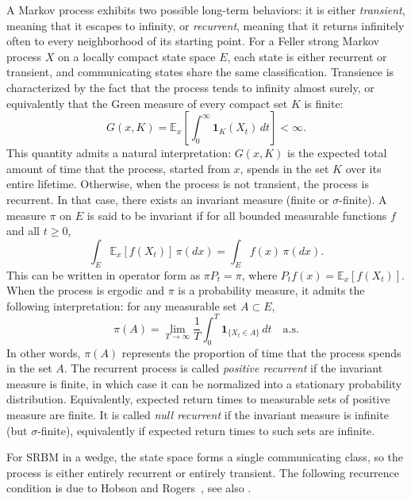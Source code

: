 \documentclass[11pt]{article}
\theoremstyle{definition}
\begin{document}
A Markov process exhibits two possible long-term behaviors: it is either
\emph{transient}, meaning that it escapes to infinity, or \emph{recurrent},
meaning that it returns infinitely often to every neighborhood of its starting
point. For a Feller strong Markov process $X$ on a locally compact state space $E$,
each state is either recurrent or transient, and communicating states share
the same classification. 
Transience is characterized by the fact that the process tends to infinity
almost surely, or equivalently that the Green measure of every compact set $K$ is
finite:
\[
G(x,K)=\mathbb{E}_x\!\left[\int_0^\infty \mathbf{1}_K(X_t)\,dt\right]<\infty.
\]
This quantity admits a natural interpretation: $G(x,K)$ is the expected total amount of time that the process, started from $x$, spends in the set $K$ over its entire lifetime.
Otherwise, when the process is not transient, the process is recurrent. In that case, there exists an invariant
measure (finite or $\sigma$-finite). A measure $\pi$ on $E$ is said to be
invariant if for all bounded measurable functions $f$ and all $t \ge 0$,
\[
\int_E \mathbb{E}_x[f(X_t)]\,\pi(dx)
=
\int_E f(x)\,\pi(dx).
\] 
This can be written in operator form as $\pi P_t=\pi$, where $P_t f(x)=\mathbb{E}_x[f(X_t)]$.
When the process is ergodic and $\pi$ is a probability measure, it admits the following interpretation: for any measurable set $A\subset E$,
\[
\pi(A) = \lim_{T\to\infty}\frac{1}{T}\int_0^T \mathbf{1}_{\{X_t\in A\}}\,dt
\quad \text{a.s.}
\]
In other words, $\pi(A)$ represents the 
proportion of time that the process spends in the set $A$.
The recurrent process is called \emph{positive recurrent} if the invariant
measure is finite, in which case it can be normalized into a stationary
probability distribution. Equivalently, expected return times to measurable
sets of positive measure are finite. 
It is called \emph{null recurrent} if the invariant measure is infinite
(but $\sigma$-finite), equivalently if expected return times to such sets
are infinite.


For SRBM in a wedge, the state space forms a single communicating class, so
the process is either entirely recurrent or entirely transient.
The following recurrence condition is due to Hobson and Rogers~\cite{hobson_recurrence_1993}, see also \cite{harrison_brownian_1987,
harrison_reflected_2009,franceschi_green_2021}. %
\end{document}
